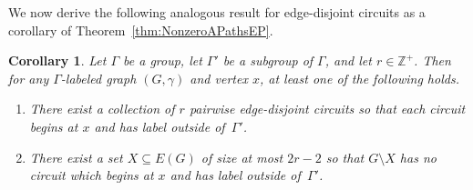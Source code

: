 \documentclass[11pt]{article}
\newtheorem{corollary}[thm]{Corollary}
\theoremstyle{definition}
\begin{document}
We now derive the following analogous result for edge-disjoint circuits as a corollary of Theorem~\ref{thm:NonzeroAPathsEP}.

\begin{corollary}\label{cor:EP}
    Let $\Gamma$ be a group, let $\Gamma'$ be a subgroup of $\Gamma$, and let $r \in \mathbb{Z}^+$. Then for any $\Gamma$-labeled graph $(G, \gamma)$ and vertex $x$, at least one of the following holds.
    \begin{enumerate}
        \item There exist a collection of $r$ pairwise edge-disjoint circuits so that each circuit begins at $x$ and has label outside of~$\Gamma'$.
        \item There exist a set $X \subseteq E(G)$ of size at most $2r-2$ so that $G\setminus X$ has no circuit which begins at $x$ and has label outside of~$\Gamma'$.
    \end{enumerate}
\end{corollary}
\end{document}
